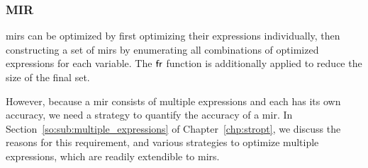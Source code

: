 \subsubsection{MIR}

\Glspl{mir} can be optimized by first optimizing their expressions
individually, then constructing a set of \glspl{mir} by enumerating all
combinations of optimized expressions for each variable.  The $\operatorname{\mathsf{fr}}$
function is additionally applied to reduce the size of the final set.

However, because a \gls{mir} consists of multiple expressions and each has its
own accuracy, we need a strategy to quantify the accuracy of a \gls{mir}\@.
In Section~\ref{so:sub:multiple_expressions} of Chapter~\ref{chp:stropt}, we
discuss the reasons for this requirement, and various strategies to optimize
multiple expressions, which are readily extendible to \glspl{mir}.
